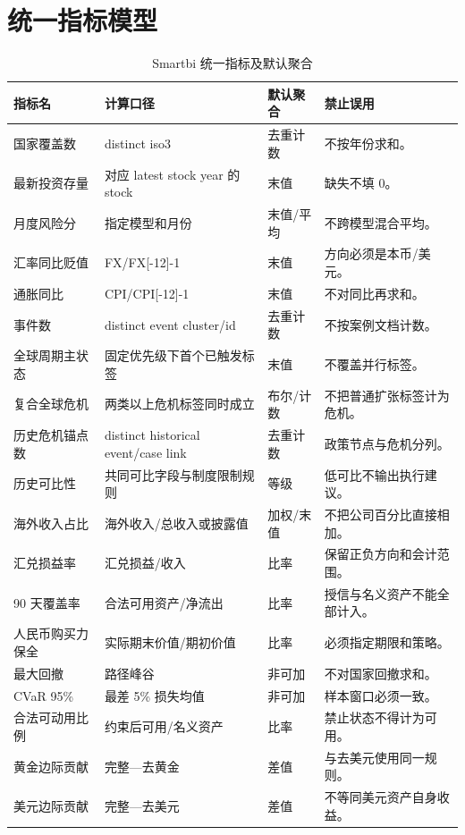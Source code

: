 \documentclass[UTF8,fontset=windows,12pt,openany]{ctexbook}
\begin{document}
\chapter{统一指标模型}

\begin{longtable}{p{3.7cm}p{4.4cm}p{3.0cm}p{2.9cm}}
\caption{Smartbi 统一指标及默认聚合}\label{tab:semantic-metrics}\\
\toprule
\textbf{指标名} & \textbf{计算口径} & \textbf{默认聚合} & \textbf{禁止误用}\\
\midrule
国家覆盖数 & distinct iso3 & 去重计数 & 不按年份求和。\\
最新投资存量 & 对应 latest stock year 的 stock & 末值 & 缺失不填 0。\\
月度风险分 & 指定模型和月份 & 末值/平均 & 不跨模型混合平均。\\
汇率同比贬值 & FX/FX[-12]-1 & 末值 & 方向必须是本币/美元。\\
通胀同比 & CPI/CPI[-12]-1 & 末值 & 不对同比再求和。\\
事件数 & distinct event cluster/id & 去重计数 & 不按案例文档计数。\\
全球周期主状态 & 固定优先级下首个已触发标签 & 末值 & 不覆盖并行标签。\\
复合全球危机 & 两类以上危机标签同时成立 & 布尔/计数 & 不把普通扩张标签计为危机。\\
历史危机锚点数 & distinct historical event/case link & 去重计数 & 政策节点与危机分列。\\
历史可比性 & 共同可比字段与制度限制规则 & 等级 & 低可比不输出执行建议。\\
海外收入占比 & 海外收入/总收入或披露值 & 加权/末值 & 不把公司百分比直接相加。\\
汇兑损益率 & 汇兑损益/收入 & 比率 & 保留正负方向和会计范围。\\
90 天覆盖率 & 合法可用资产/净流出 & 比率 & 授信与名义资产不能全部计入。\\
人民币购买力保全 & 实际期末价值/期初价值 & 比率 & 必须指定期限和策略。\\
最大回撤 & 路径峰谷 & 非可加 & 不对国家回撤求和。\\
CVaR 95\% & 最差 5\% 损失均值 & 非可加 & 样本窗口必须一致。\\
合法可动用比例 & 约束后可用/名义资产 & 比率 & 禁止状态不得计为可用。\\
黄金边际贡献 & 完整—去黄金 & 差值 & 与去美元使用同一规则。\\
美元边际贡献 & 完整—去美元 & 差值 & 不等同美元资产自身收益。\\
\bottomrule
\end{longtable}
\end{document}
